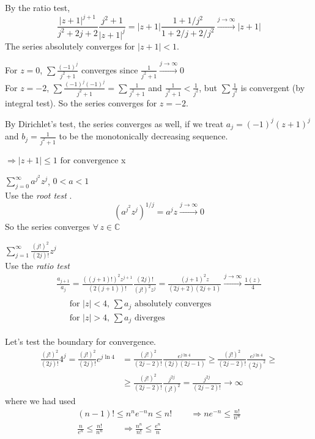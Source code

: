 \documentclass[twoside]{amsart}
\theoremstyle{plain}
\theoremstyle{definition}
\newcommand{\exercisehead}[1]
  {\smallskip
   \noindent{\small\bf Exercise #1.}}
\begin{document}
By the ratio test,
\[
\frac{ |z+1|^{j+1} }{ j^2 + 2j + 2 } \frac{j^2 + 1 }{ |z+1|^j } = |z+1| \frac{1  + 1/j^2 }{ 1 + 2/j + 2/j^2 } \xrightarrow{ j\to \infty} |z+1|
\]
The series absolutely converges for $|z+1| < 1$.  

For $z=0$, $\sum \frac{(-1)^j}{ j^2 + 1 }$ converges since $\frac{1}{j^2 + 1 } \xrightarrow{ j \to \infty} 0 $ \bigskip \\

For $z=-2$, $\sum \frac{ (-1)^j (-1)^j }{j^2 + 1} = \sum \frac{1}{ j^2 + 1}$ and $\frac{1}{j^2+1} < \frac{1}{j^2}$, but $\sum \frac{1}{j^2}$ is convergent (by integral test).  So the series converges for $z=-2$.  

By Dirichlet's test, the series converges as well, if we treat $a_j = (-1)^j (z+1)^j$ and $b_j = \frac{1}{j^2+1}$ to be the monotonically decreasing sequence.  

$\Longrightarrow  \boxed{ |z+1| \leq 1 } \text{ for convergence } $x

\exercisehead{8} $\sum_{j=0}^{\infty} a^{j^2} z^j$, $0 <a < 1$ \medskip \\
Use the \emph{ root test }.  
\[
(a^{j^2}z^j )^{1/j} = a^j z \xrightarrow{ j \to \infty} 0 
\]
So the series converges $\forall \, z \in \mathbb{C}$ 

\exercisehead{9} $\sum_{j=1}^{\infty} \frac{ (j!)^2}{ (2j)!} z^j$  \bigskip \\
Use the \emph{ ratio test } \\
\[
\begin{gathered}
\frac{ a_{j+1}}{ a_j } = \frac{ ((j+1)! )^2 z^{j+1} }{ (2(j+1))! } \frac{ (2j)!}{(j!)^2 z^j } = \frac{ (j+1)^2 z }{ (2j+2)(2j+1) } \xrightarrow{ j \to \infty} \frac{ 1 (z)}{ 4 } \\
\begin{aligned}
  & \text{ for $|z| < 4$, $\sum a_j$ absolutely converges } \\
  & \text{ for $|z| > 4$, $\sum a_j$ diverges }
\end{aligned}
\end{gathered}
\]

Let's test the boundary for convergence.  
\[
  \begin{aligned}
    \frac{(j!)^2}{(2j)!} 4^j = \frac{(j!)^2}{ (2j)! } e^{ j \ln{4}} & = \frac{ (j!)^2 }{ (2j-2)! } \frac{ e^{j\ln{4}} }{ (2j)(2j-1) } \geq \frac{ (j!)^2 }{ (2j-2)! } \frac{ e^{j \ln{4}} }{ (2j)^2 } \geq \\
    & \geq \frac{(j!)^2 }{ (2j-2)! } \frac{j^{2j} }{ (j!)^2 } = \frac{j^{2j}}{ (2j-2)! } \to \boxed{ \infty }
\end{aligned}
\]
where we had used
\[
\begin{gathered}
  (n-1)! \leq n^n e^{-n} n \leq n! \quad \quad \, \Longrightarrow ne^{-n} \leq \frac{n!}{n^n } \\
  \frac{n}{e^n } \leq \frac{n!}{n^n } \quad \quad \, \Longrightarrow \frac{n^n}{n!} \leq \frac{e^n}{n}
\end{gathered}
\]
\end{document}
